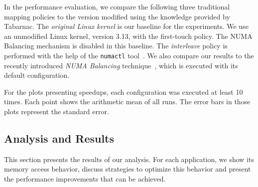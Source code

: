In the performance evaluation, we compare the following three traditional
mapping policies to the version modified using the knowledge provided by \gls{Tabarnac}.
The \emph{original Linux kernel} is our baseline for the experiments. We use an unmodified Linux kernel, version 3.13, with the first-touch policy. The NUMA Balancing mechanism is disabled in this baseline.
The \emph{interleave} policy is performed with the help of the \texttt{numactl} tool~\cite{Kleen05NUMA}.
We also compare our results to the recently introduced \emph{NUMA Balancing} technique~\cite{Corbet12Toward}, which is executed with its default configuration.

For the plots presenting speedups, each configuration was executed at least 10 times. Each point shows the arithmetic mean of all runs.
The error bars in those plots represent the standard error.


\subsection{Analysis and Results}

This section presents the results of our analysis.
For each application, we show its memory access behavior, discuss strategies to optimize this behavior and present the performance improvements that can be achieved.


